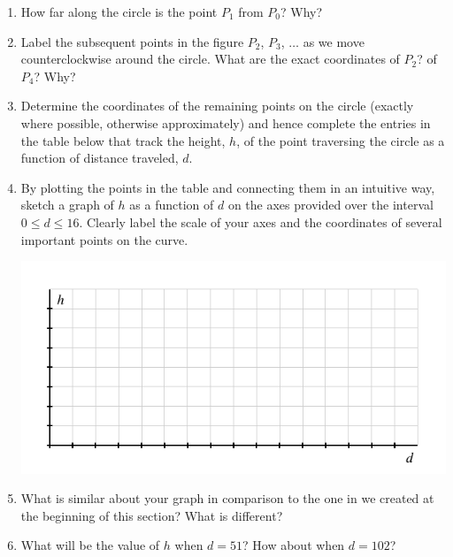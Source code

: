 \documentclass[nooutcomes, noauthor]{ximera}
\begin{document}
\begin{exploration}
\begin{enumerate}[label=\alph*.]
\item
How far along the circle is the point \(P_1\) from \(P_0\)?  Why?%
\item
Label the subsequent points in the figure \(P_2\), \(P_3\), \(\ldots\) as we move counterclockwise around the circle.  What are the exact coordinates of \(P_2\)?  of \(P_4\)?  Why?%
\item
Determine the coordinates of the remaining points on the circle (exactly where possible, otherwise approximately) and hence complete the entries in the table below that track the height, \(h\), of the point traversing the circle as a function of distance traveled, \(d\).%
\item
By plotting the points in the table and connecting them in an intuitive way, sketch a graph of \(h\) as a function of \(d\) on the axes provided over the interval \(0 \le d \le 16\).  Clearly label the scale of your axes and the coordinates of several important points on the curve.
\begin{image}
\includegraphics{traversing-act-circular-grid.pdf}
\end{image}
\item
What is similar about your graph in comparison to the one in we created at the beginning of this section?  What is different?%
\item
What will be the value of \(h\) when \(d = 51\)?  How about when \(d = 102\)?%
\end{enumerate}

\end{exploration}
\end{document}
